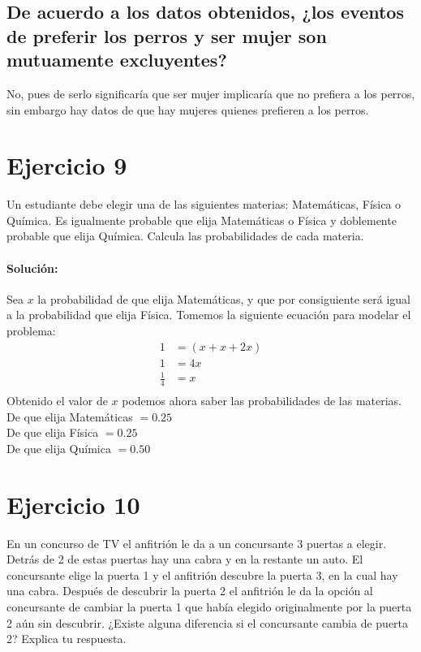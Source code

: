\documentclass[12pt]{article}
\begin{document}
\subsection{De acuerdo a los datos obtenidos, ¿los eventos de preferir los perros y ser mujer son mutuamente excluyentes?}
No, pues de serlo significaría que ser mujer implicaría que no prefiera a los perros, sin embargo hay datos de que hay mujeres quienes prefieren a los perros.
\section{Ejercicio 9}
Un estudiante debe elegir una de las siguientes materias: Matemáticas, Física o Química. Es
igualmente probable que elija Matemáticas o Física y doblemente probable que elija Química.
Calcula las probabilidades de cada materia.
\paragraph{Solución: } Sea $x$ la probabilidad de que elija Matemáticas, y que por consiguiente será igual a la probabilidad que elija Física. Tomemos la siguiente ecuación para modelar el problema:
\begin{equation}
	\begin{split}
		1 &= (x + x + 2x)\\
		1 &= 4x\\
		\frac{1}{4} &= x\\
	\end{split}
\end{equation}
Obtenido el valor de $x$ podemos ahora saber las probabilidades de las materias.\\
De que elija Matemáticas $ = 0.25$\\
De que elija Física $ = 0.25$\\
De que elija Química $ = 0.50$\\
\section{Ejercicio 10}
En un concurso de TV el anfitrión le da a un concursante 3 puertas a elegir. Detrás de 2 de
estas puertas hay una cabra y en la restante un auto. El concursante elige la puerta 1 y el
anfitrión descubre la puerta 3, en la cual hay una cabra. Después de descubrir la puerta 2 el
anfitrión le da la opción al concursante de cambiar la puerta 1 que había elegido originalmente
por la puerta 2 aún sin descubrir. ¿Existe alguna diferencia si el concursante cambia de puerta
2? Explica tu respuesta.
\end{document}
